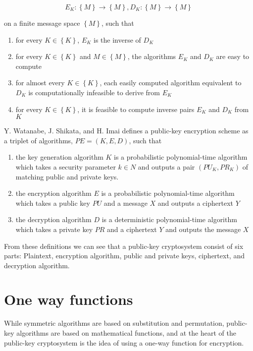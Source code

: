 \documentclass[english,titlepage,11pt]{article}
\begin{document}
\[
E_K: \left \{  M \right \} \rightarrow \left \{  M \right \}, 
D_K: \left \{  M \right \} \rightarrow \left \{  M \right \}
\]

on a finite message space $\left \{  M \right \}$, such that

\begin{enumerate}
  \item for every $K \in \left \{ K \right \}$, $E_K$ is the inverse of $D_K$
  \item for every $K \in \left \{ K \right \}$ and $M \in \left \{ M \right \}$, the algorithms $E_K$ and $D_K$ are easy to compute
  \item for almost every $K \in \left \{ K \right \}$, each easily computed algorithm equivalent to $D_K$ is computationally infeasible to derive from $E_K$
  \item for every $K \in \left \{ K \right \}$, it is feasible to compute inverse pairs $E_K$ and $D_K$ from $K$
\end{enumerate}

Y. Watanabe, J. Shikata, and H. Imai defines\cite{watanabe02} a public-key encryption scheme as a triplet of algorithms, $PE=(K,E,D)$, such that

\begin{enumerate}
  \item the key generation algorithm $K$ is a probabilistic polynomial-time algorithm which takes a security parameter $k \in N$ and outputs a pair $(PU_K, PR_K)$ of matching public and private keys.
  \item the encryption algorithm $E$ is a probabilistic polynomial-time algorithm which takes a public key $PU$ and a message $X$ and outputs a ciphertext $Y$ 
 \item the decryption algorithm $D$ is a deterministic polynomial-time algorithm which takes a private key $PR$ and a ciphertext $Y$ and outputs the message $X$
\end{enumerate}

From these definitions we can see that a public-key cryptosystem consist of six parts: Plaintext, encryption algorithm, public and private keys, ciphertext, and decryption algorithm.

\section{One way functions}

While symmetric algorithms are based on substitution and permutation, public-key algorithms are based on mathematical functions\cite{stallings06}, and at the heart of the public-key cryptosystem is the idea of using a one-way function for encryption\cite{koblitz04}.
\end{document}
